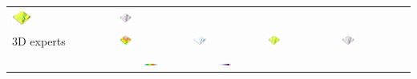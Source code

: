 \documentclass[Afour,sageh,times]{sagej}
\begin{document}
\begin{table}[h]
\begin{tabular}{m{} m{} m{} m{} m{}}
\includegraphics[width=0.2\textwidth]{images/render_3d/3d_novices/mean_depth_5.png} &
\includegraphics[width=0.2\textwidth]{images/render_3d/3d_novices/mean_depth_difference_5.png}\\
%
3D experts & 
\includegraphics[width=0.2\textwidth]{images/render_3d/3d_experts/mean_dem_5.png} &
\includegraphics[width=0.2\textwidth]{images/render_3d/3d_experts/stdev_regression_difference_series_5.png} &
\includegraphics[width=0.2\textwidth]{images/render_3d/3d_experts/mean_depth_5.png} &
\includegraphics[width=0.2\textwidth]{images/render_3d/3d_experts/mean_depth_difference_5.png}\\
%
& 
\multicolumn{1}{c}{\includegraphics[width=0.2\textwidth]{images/legends/elevation_legend_5.pdf}} &
\multicolumn{1}{c}{\includegraphics[width=0.2\textwidth]{images/legends/stdev_diff_legend.pdf}} &

\end{tabular}
\end{table}
\end{document}
